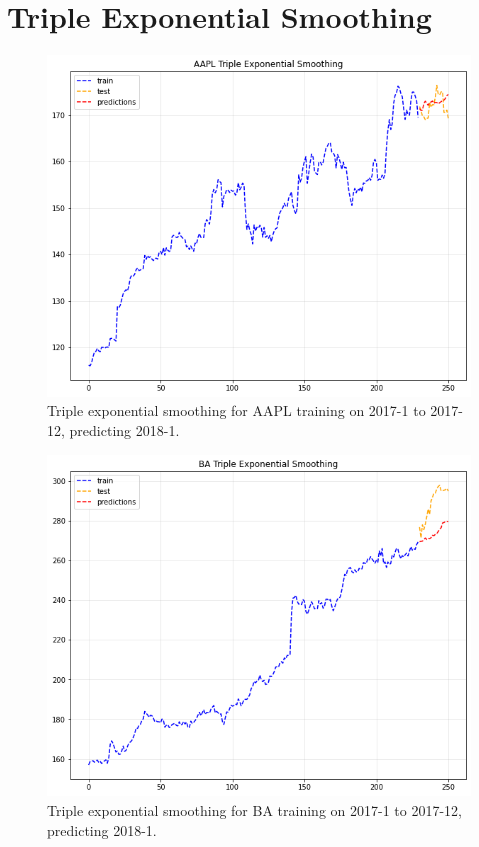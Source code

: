 \documentclass[11pt]{article}
\begin{document}
\section{Triple Exponential Smoothing}\label{section-tsmoothing}

\begin{figure}[h!]
\centerline{\includegraphics[scale=0.5]{tes_1.png}}
\caption{Triple exponential smoothing for AAPL training on 2017-1 to 2017-12, predicting 2018-1.}
\end{figure}

\begin{figure}[h!]
\centerline{\includegraphics[scale=0.5]{tes_2.png}}
\caption{Triple exponential smoothing for BA training on 2017-1 to 2017-12, predicting 2018-1.}
\end{figure}
\end{document}
